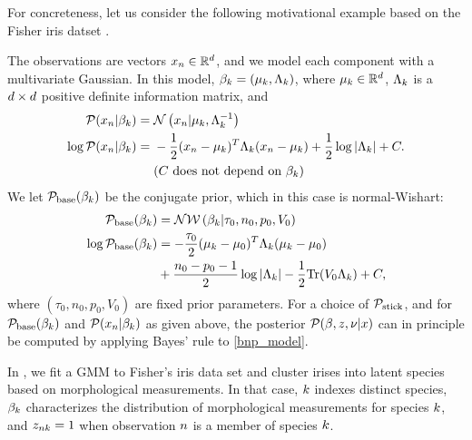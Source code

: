 For concreteness, let us consider the following motivational example
based on the Fisher iris datset \citep{anderson:1936:iris, fisher:1936:iris}.

\begin{ex}
%
The observations are vectors $x_n \in \mathbb{R}^d$, and we model each
component with a multivariate Gaussian. In this model, $\beta_k = (\mu_k,
\Lambda_k)$, where $\mu_k \in \mathbb{R}^d$, $\Lambda_k$ is a $d\times d$
positive definite information matrix, and
%
\begin{align*}
%
\p(\x_\n \vert \beta_\k) ={}& \normdist{\x_n \vert \mu_\k, \Lambda_\k^{-1}} \\
\logp(\x_\n \vert \beta_\k) ={}&
    -\frac{1}{2}(\x_n - \mu_k)^T \Lambda_\k (\x_n - \mu_k)
    + \frac{1}{2} \log |\Lambda_\k| + \const.\\
    & \constdesc{\beta_\k}
%
\end{align*}
We let $\mathcal{P}_{\mathrm{base}}(\beta_k)$ be the conjugate prior, which in this case is normal-Wishart:
\begin{align*}
  \mathcal{P}_{\mathrm{base}}(\beta_k) &= \mathcal{N}\mathcal{W}\left(\beta_k \vert \tau_0, n_0, p_0, V_0\right)\\
  \log\mathcal{P}_{\mathrm{base}}(\beta_k) &=
      -\frac{\tau_0}{2}(\mu_k - \mu_0)^T \Lambda_k (\mu_k - \mu_0)\\
      &{} + \frac{n_0 - p_0 - 1}{2} \log |\Lambda_k| -
      \frac{1}{2} \textrm{Tr}(V_0 \Lambda_k) + C,
\end{align*}
where $(\tau_0, n_0, p_0, V_0)$ are fixed prior parameters.
%
For a choice of $\mathcal{P}_{\mathrm{stick}}$, and for $\mathcal{P}_{\mathrm{base}}(\beta_k)$ and $\mathcal{P}(x_n \vert
\beta_k)$ as given above, the posterior $\mathcal{P}(\beta, z, \nu \vert x)$ can in
principle be computed by applying Bayes' rule to \eqref{bnp_model}.

In , we fit a GMM to Fisher's iris data set and cluster irises
into latent species based on morphological measurements.  In that case, $k$
indexes distinct species, $\beta_{k}$ characterizes the distribution of
morphological measurements for species $k$, and $z_{nk} = 1$ when
observation $n$ is a member of species $k$.
%
\end{ex}



